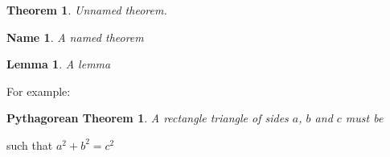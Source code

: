 \documentclass{article}
\newtheorem{theorem0}{Theorem}
\newtheorem*{theorem1}{Name}
\newtheorem{theorem2}{Lemma}
\newtheorem*{theorem3}{Pythagorean Theorem}
\begin{document}
\begin{theorem0}
    Unnamed theorem.
\end{theorem0}

\vspace{5mm}

\begin{theorem1}
    A named theorem
\end{theorem1}

\vspace{5mm}

\begin{theorem2}
    A lemma
\end{theorem2}

\vspace{5mm}

For example:

\begin{theorem3}
    A rectangle triangle of sides $a$, $b$ and $c$ must be
\end{theorem3}

    such that $a^2 + b^2 = c^2$
\end{document}
